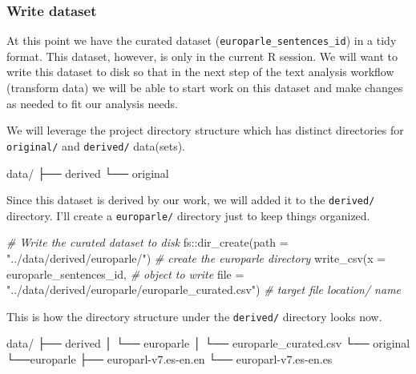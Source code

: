 \documentclass[
]{article}
\newenvironment{Shaded}{\begin{snugshade}}{\end{snugshade}}
\newcommand{\AttributeTok}[1]{\textcolor[rgb]{0.77,0.63,0.00}{#1}}
\newcommand{\CommentTok}[1]{\textcolor[rgb]{0.56,0.35,0.01}{\textit{#1}}}
\newcommand{\ExtensionTok}[1]{#1}
\newcommand{\FunctionTok}[1]{\textcolor[rgb]{0.00,0.00,0.00}{#1}}
\newcommand{\NormalTok}[1]{#1}
\newcommand{\SpecialCharTok}[1]{\textcolor[rgb]{0.00,0.00,0.00}{#1}}
\newcommand{\StringTok}[1]{\textcolor[rgb]{0.31,0.60,0.02}{#1}}
\begin{document}
\hypertarget{write-dataset}{%
\subsubsection{Write dataset}\label{write-dataset}}

At this point we have the curated dataset (\texttt{europarle\_sentences\_id}) in a tidy format. This dataset, however, is only in the current R session. We will want to write this dataset to disk so that in the next step of the text analysis workflow (transform data) we will be able to start work on this dataset and make changes as needed to fit our analysis needs.

We will leverage the project directory structure which has distinct directories for \texttt{original/} and \texttt{derived/} data(sets).

\begin{Shaded}
\begin{Highlighting}[]
\ExtensionTok{data/}
\ExtensionTok{├──}\NormalTok{ derived}
\ExtensionTok{└──}\NormalTok{ original}
\end{Highlighting}
\end{Shaded}

Since this dataset is derived by our work, we will added it to the \texttt{derived/} directory. I'll create a \texttt{europarle/} directory just to keep things organized.

\begin{Shaded}
\begin{Highlighting}[]
\CommentTok{\# Write the curated dataset to disk}
\NormalTok{fs}\SpecialCharTok{::}\FunctionTok{dir\_create}\NormalTok{(}\AttributeTok{path =} \StringTok{"../data/derived/europarle/"}\NormalTok{) }\CommentTok{\# create the europarle directory}
\FunctionTok{write\_csv}\NormalTok{(}\AttributeTok{x =}\NormalTok{ europarle\_sentences\_id, }\CommentTok{\# object to write}
          \AttributeTok{file =} \StringTok{"../data/derived/europarle/europarle\_curated.csv"}\NormalTok{) }\CommentTok{\# target file location/ name}
\end{Highlighting}
\end{Shaded}

This is how the directory structure under the \texttt{derived/} directory looks now.

\begin{Shaded}
\begin{Highlighting}[]
\ExtensionTok{data/}
\ExtensionTok{├──}\NormalTok{ derived}
\ExtensionTok{│}\NormalTok{   └── europarle}
\ExtensionTok{│}\NormalTok{       └── europarle\_curated.csv}
\ExtensionTok{└──}\NormalTok{ original}
    \ExtensionTok{└──europarle}
        \ExtensionTok{├──}\NormalTok{ europarl{-}v7.es{-}en.en}
        \ExtensionTok{└──}\NormalTok{ europarl{-}v7.es{-}en.es}
\end{Highlighting}
\end{Shaded}
\end{document}

